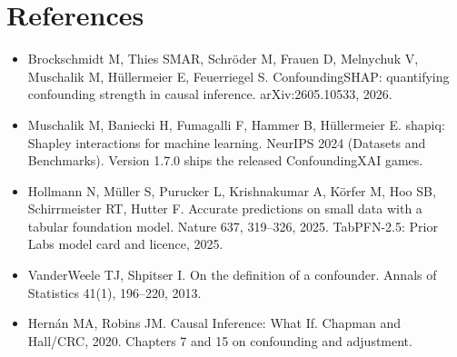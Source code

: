\documentclass[10pt,letterpaper]{article}
\begin{document}
\section*{References}
\begin{itemize}\setlength{\itemsep}{1pt}
\item Brockschmidt M, Thies SMAR, Schr\"oder M, Frauen D, Melnychuk V, Muschalik M, H\"ullermeier E, Feuerriegel S. ConfoundingSHAP: quantifying confounding strength in causal inference. arXiv:2605.10533, 2026.
\item Muschalik M, Baniecki H, Fumagalli F, Hammer B, H\"ullermeier E. shapiq: Shapley interactions for machine learning. NeurIPS 2024 (Datasets and Benchmarks). Version 1.7.0 ships the released ConfoundingXAI games.
\item Hollmann N, M\"uller S, Purucker L, Krishnakumar A, K\"orfer M, Hoo SB, Schirrmeister RT, Hutter F. Accurate predictions on small data with a tabular foundation model. Nature 637, 319--326, 2025. TabPFN-2.5: Prior Labs model card and licence, 2025.
\item VanderWeele TJ, Shpitser I. On the definition of a confounder. Annals of Statistics 41(1), 196--220, 2013.
\item Hern\'an MA, Robins JM. Causal Inference: What If. Chapman and Hall/CRC, 2020. Chapters 7 and 15 on confounding and adjustment.
\end{itemize}
\end{document}
